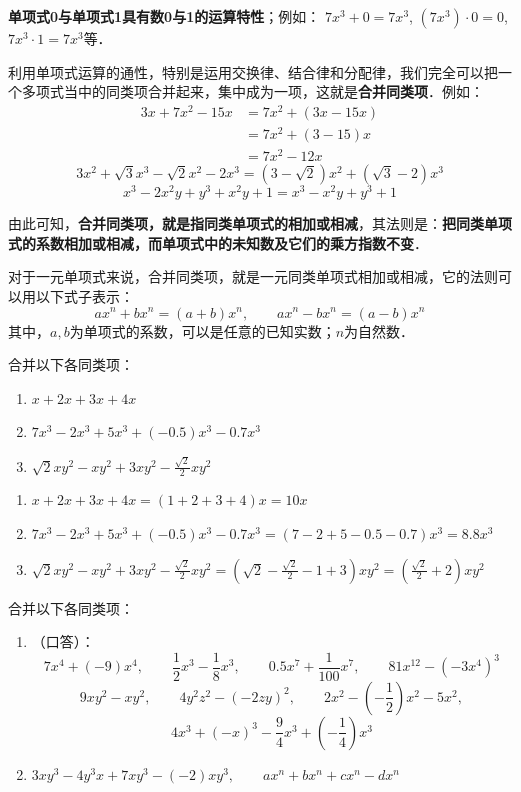 \textbf{单项式0与单项式1具有数0与1的运算特性}；例如：
$7x^3+0=7x^3$, $(7x^3)\cdot 0=0$, $7x^3\cdot 1=7x^3$等．

利用单项式运算的通性，特别是运用交换律、结合律和分配律，我们完全可以把一个多项式当中的同类项合并起来，集中成为一项，这就是\textbf{合并同类项}．例如：
\begin{align*}
3x+7x^2-15x &= 7x^2+(3x-15x) \tag{交换律，结合律}\\
&=7x^2+(3-15)x \tag{分配律}\\
&=7x^2-12x
\end{align*}
\[3x^2+\sqrt{3}x^3-\sqrt{2}x^2-2x^3=(3-\sqrt{2})x^2+(\sqrt{3}-2)x^3 \]
\[x^3-2x^2y+y^3+x^2y+1=x^3-x^2y+y^3+1 \]

由此可知，\textbf{合并同类项，就是指同类单项式的相加或相减}，其法则是：\textbf{把同类单项式的系数相加或相减，而单项式中的未知数及它们的乘方指数不变}．

对于一元单项式来说，合并同类项，就是一元同类单项式相加或相减，它的法则可以用以下式子表示：
\[\boxed{ax^n +bx^n = (a+b)x^n,\qquad  ax^n -bx^n =(a-b)x^n}\]
其中，$a,b$为单项式的系数，可以是任意的已知实数；$n$为自然数．

\begin{example}
    合并以下各同类项：
    \begin{enumerate}
        \item $x+2x+3x+4x$
        \item $7x^3-2x^3+5x^3+(-0.5)x^3-0.7x^3$
        \item $\sqrt{2}xy^2-xy^2+3xy^2-\frac{\sqrt{2}}{2}xy^2  $
    \end{enumerate}
\end{example}

\begin{solution}
    \begin{enumerate}
        \item $x+2x+3x+4x=(1+2+3+4)x=10x$
        \item $7x^3-2x^3+5x^3+(-0.5)x^3-0.7x^3=(7-2+5-0.5-0.7)x^3=8.8x^3$
        \item $\sqrt{2}xy^2-xy^2+3xy^2-\frac{\sqrt{2}}{2}xy^2=\left(\sqrt{2}-\frac{\sqrt{2}}{2}-1+3\right)xy^2=\left(\frac{\sqrt{2}}{2}+2\right)xy^2$
    \end{enumerate}
\end{solution}

\begin{ex}
    合并以下各同类项：
\begin{enumerate}
    \item （口答）：
    \[7x^4+(-9)x^4,\qquad \frac{1}{2}x^3-\frac{1}{8}x^3,\qquad 0.5x^7+\frac{1}{100}x^7,\qquad 81x^{12}-(-3x^4)^3\]
    \[ 9xy^2-xy^2 ,\qquad 4y^2z^2-(-2zy)^2,\qquad 2x^2-\left(-\frac{1}{2}\right)x^2-5x^2,\]\[ 4x^3+(-x)^3-\frac{9}{4}x^3+\left(-\frac{1}{4}\right)x^3 \]
    \item $3xy^3-4y^3x+7xy^3-(-2)xy^3,\qquad ax^n+bx^n+cx^n-dx^n$
\end{enumerate}
\end{ex}


